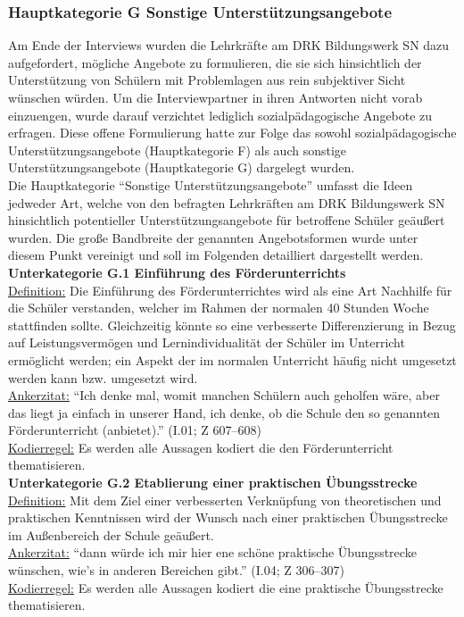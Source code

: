 \subsubsection{Hauptkategorie G Sonstige Unterstützungsangebote}
\label{sec:HauptkategorieGSonstigeUnterstützungsangebote}

Am Ende der Interviews wurden die Lehrkräfte am DRK Bildungswerk SN dazu aufgefordert, mögliche Angebote zu formulieren, die sie sich hinsichtlich der Unterstützung von Schülern mit Problemlagen aus rein subjektiver Sicht wünschen würden. Um die Interviewpartner in ihren Antworten nicht vorab einzuengen, wurde darauf verzichtet lediglich sozialpädagogische Angebote zu erfragen. Diese offene Formulierung hatte zur Folge das sowohl sozialpädagogische Unterstützungsangebote (Hauptkategorie F) als auch sonstige Unterstützungsangebote (Hauptkategorie G) dargelegt wurden.\\
Die Hauptkategorie "`Sonstige Unterstützungsangebote"' umfasst die Ideen jedweder Art, welche von den befragten Lehrkräften am DRK Bildungswerk SN hinsichtlich potentieller Unterstützungsangebote für betroffene Schüler geäußert wurden. Die große Bandbreite der genannten Angebotsformen wurde unter diesem Punkt vereinigt und soll im Folgenden detailliert dargestellt werden.\\

\textbf{Unterkategorie G.1 Einführung des Förderunterrichts}\\
\underline{Definition:} Die Einführung des Förderunterrichtes wird als eine Art Nachhilfe für die Schüler verstanden, welcher im Rahmen der normalen 40 Stunden Woche stattfinden sollte. Gleichzeitig könnte so eine verbesserte Differenzierung in Bezug auf Leistungsvermögen und Lernindividualität der Schüler im Unterricht ermöglicht werden; ein Aspekt der im normalen Unterricht häufig nicht umgesetzt werden kann bzw. umgesetzt wird.\\
\underline{Ankerzitat:} "`Ich denke mal, womit manchen Schülern auch geholfen wäre, aber das liegt ja einfach in unserer Hand, ich denke, ob die Schule den so genannten Förderunterricht (anbietet)."' (I.01; Z 607--608)\\
\underline{Kodierregel:} Es werden alle Aussagen kodiert die den Förderunterricht thematisieren.\\

\textbf{Unterkategorie G.2 Etablierung einer praktischen Übungsstrecke}\\
\underline{Definition:} Mit dem Ziel einer verbesserten Verknüpfung von theoretischen und praktischen Kenntnissen wird der Wunsch nach einer praktischen Übungsstrecke im Außenbereich der Schule geäußert.\\
\underline{Ankerzitat:} "`dann würde ich mir hier ene schöne praktische Übungsstrecke wünschen, wie's in anderen Bereichen gibt."' (I.04; Z 306--307)\\
\underline{Kodierregel:} Es werden alle Aussagen kodiert die eine praktische Übungsstrecke thematisieren.\\

